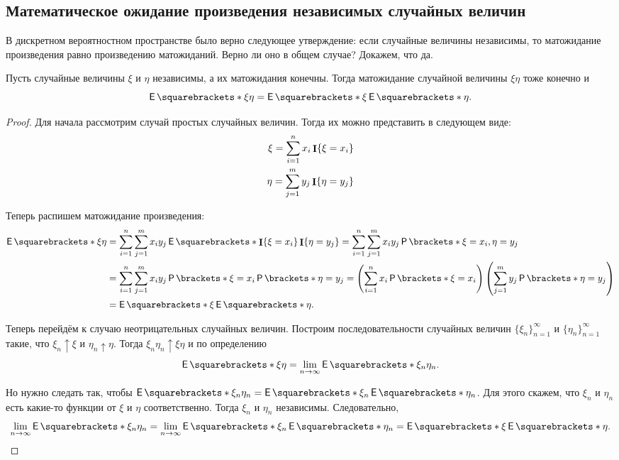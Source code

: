 \subsection{Математическое ожидание произведения независимых случайных величин}
В дискретном вероятностном пространстве было верно следующее утверждение: если случайные величины независимы, то матожидание произведения равно произведению матожиданий. Верно ли оно в общем случае? Докажем, что да.
\begin{theorem}
	Пусть случайные величины \(\xi\) и \(\eta\) независимы, а их матожидания конечны. Тогда матожидание случайной величины \(\xi\eta\) тоже конечно и
	\[
	\E{\xi\eta} = \E{\xi}\E{\eta}.
	\]
\end{theorem}
\begin{proof}
	Для начала рассмотрим случай простых случайных величин. Тогда их можно представить в следующем виде:
	\begin{align}
		\xi = \sum\limits_{i = 1}^{n} x_{i}\mathop{\mathbf{I}}\{\xi = x_{i}\} \\
		\eta = \sum\limits_{j = 1}^{m} y_{j}\mathop{\mathbf{I}}\{\eta = y_{j}\}
	\end{align}
	
	Теперь распишем матожидание произведения:
	\begin{align}
		\E{\xi\eta} &= \sum_{i = 1}^{n}\sum_{j = 1}^{m} x_{i}y_{j}\E{\I\{\xi = x_{i}\}\I\{\eta = y_{j}\}} = \sum_{i = 1}^{n}\sum_{j = 1}^{m} x_{i}y_{j}\Pr{\xi = x_{i}, \eta = y_{j}} \\
		&= \sum_{i = 1}^{n}\sum_{j = 1}^{m} x_{i}y_{j}\Pr{\xi = x_{i}}\Pr{\eta = y_{j}} = \left(\sum_{i = 1}^{n} x_{i}\Pr{\xi = x_{i}}\right)\left(\sum_{j = 1}^{m} y_{j}\Pr{\eta = y_{j}}\right) \\
		&= \E{\xi}\E{\eta}.
	\end{align}
	
	Теперь перейдём к случаю неотрицательных случайных величин. Построим последовательности случайных величин \(\{\xi_n\}_{n = 1}^{\infty}\) и \(\{\eta_n\}_{n = 1}^{\infty}\) такие, что \(\xi_n \uparrow \xi\) и \(\eta_n \uparrow \eta\). Тогда \(\xi_n\eta_n \uparrow \xi\eta\) и по определению
	\[
	\E{\xi\eta} = \lim\limits_{n \to \infty} \E{\xi_n \eta_n}.
	\]
	
	Но нужно следать так, чтобы \(\E{\xi_n \eta_n} = \E{\xi_n} \E{\eta_n}\). Для этого скажем, что \(\xi_n\) и \(\eta_n\) есть какие-то функции от \(\xi\) и \(\eta\) соответственно. Тогда  \(\xi_n\) и \(\eta_n\) независимы. Следовательно,
	\[
	\lim\limits_{n \to \infty} \E{\xi_n \eta_n} = \lim\limits_{n \to \infty} \E{\xi_n} \E{\eta_n} = \E{\xi} \E{\eta}.
	\]
	

\end{proof}

